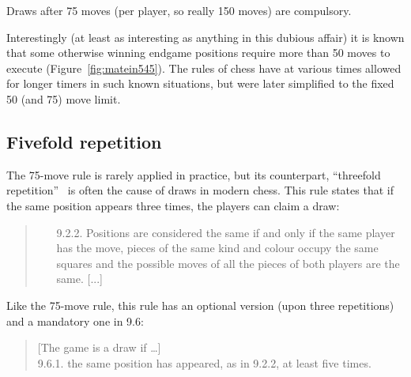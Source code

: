 \documentclass[twocolumn]{article}
\renewcommand\comment[1]{}
\begin{document}
Draws after 75 moves (per player, so really 150 moves) are compulsory.

Interestingly (at least as interesting as anything in this dubious
affair) it is known that some otherwise winning endgame positions
require more than 50 moves to execute (Figure~\ref{fig:matein545}).
The rules of chess have at various times allowed for longer timers in
such known situations, but were later simplified to the fixed 50 (and
75) move limit.

\subsection{Fivefold repetition} \label{sec:fivefold}

The 75-move rule is rarely applied in practice, but its
counterpart, ``threefold repetition''~\cite{wikipediathreefold} is often
the cause of draws in modern chess. This rule states that if the same
position appears three times, the players can claim a draw:

\begin{quote}
\begin{itemize}
  \item[9.2.2.] Positions are considered the same if and only if the
same player has the move, pieces of the same kind and colour occupy
the same squares and the possible moves of all the pieces of both
players are the same. [...]
\comment{
  Thus positions are not the same if:
\begin{itemize}
\item[9.2.2.1.]	at the start of the sequence a pawn could have been captured en passant
\item[9.2.2.2.]	a king had castling rights with a rook that has not been moved, but forfeited these after moving. The castling rights are lost only after the king or rook is moved.
\end{itemize}
}
\end{itemize}
\end{quote}

Like the 75-move rule, this rule has an optional version (upon
three repetitions) and a mandatory one in 9.6:

\begin{quote}
  [The game is a draw if \ldots] \\
  9.6.1. the same position has appeared, as in 9.2.2, at least five times.
\end{quote}
\end{document}
